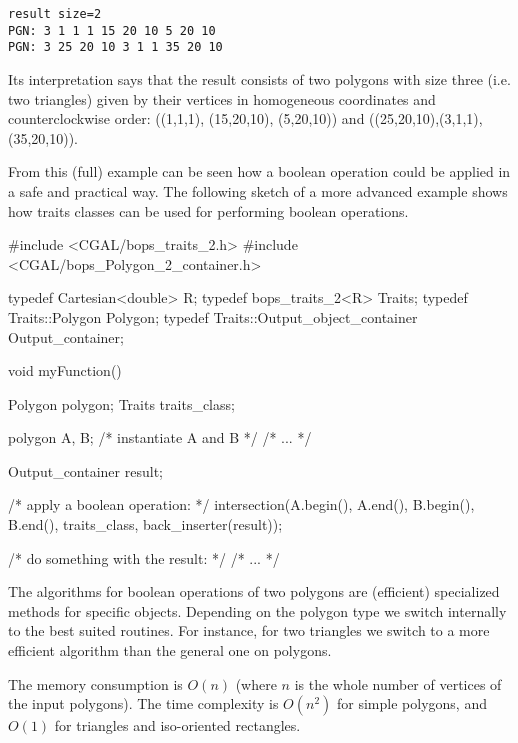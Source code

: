 \begin{verbatim}
result size=2
PGN: 3 1 1 1 15 20 10 5 20 10 
PGN: 3 25 20 10 3 1 1 35 20 10 
\end{verbatim}

Its interpretation says that the result consists of two polygons
with size three (i.e. two triangles)
given by their vertices in homogeneous coordinates and counterclockwise order:
((1,1,1), (15,20,10), (5,20,10)) and ((25,20,10),(3,1,1),(35,20,10)).


From this (full) example can be seen how a boolean operation
could be applied in a safe and practical way.
The following sketch of a more advanced example shows how traits classes
can be used for performing boolean operations.

\begin{ccAdvanced}

\begin{cprog}

#include <CGAL/bops_traits_2.h>
#include <CGAL/bops_Polygon_2_container.h>

typedef Cartesian<double> R;
typedef bops_traits_2<R> Traits;
typedef Traits::Polygon Polygon;
typedef Traits::Output_object_container Output_container;

void myFunction() {
  Polygon polygon;
  Traits  traits_class;

  polygon A, B; /* instantiate A and B */
  /* ... */

  Output_container result; 

  /* apply a boolean operation: */
  intersection(A.begin(), A.end(), B.begin(), B.end(),
                    traits_class, back_inserter(result));

  /* do something with the result: */
  /* ... */

}
\end{cprog}

\end{ccAdvanced}




\ccImplementation

The algorithms for boolean operations of two polygons are (efficient)
specialized methods for specific objects.
Depending on the polygon type we switch internally to the best suited 
routines. For instance, for two triangles we switch to a more
efficient algorithm than the general one on polygons.

The memory consumption is $O(n)$
(where $n$ is the whole number of vertices of the input polygons).
The time complexity is $O(n^2)$ for simple polygons,
and $O(1)$ for triangles and iso-oriented rectangles.

